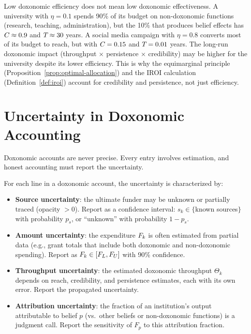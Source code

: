 \begin{remark}
\label{rem:efficiency-effectiveness}
Low doxonomic efficiency does not mean low doxonomic effectiveness.
A university with $\eta = 0.1$ spends 90\% of its budget on non-doxonomic functions (research, teaching, administration), but the 10\% that produces belief effects has $C_{} \approx 0.9$ and $T_{} \approx 30$ years.
A social media campaign with $\eta = 0.8$ converts most of its budget to reach, but with $C_{} = 0.15$ and $T_{} = 0.01$ years.
The long-run doxonomic impact (throughput $\times$ persistence $\times$ credibility) may be higher for the university despite its lower efficiency.
This is why the equimarginal principle (Proposition~\ref{prop:optimal-allocation}) and the IROI calculation (Definition~\ref{def:iroi}) account for credibility and persistence, not just efficiency.
\end{remark}


\section{Uncertainty in Doxonomic Accounting}
\label{sec:ch14-uncertainty}

Doxonomic accounts are never precise.
Every entry involves estimation, and honest accounting must report the uncertainty.

\begin{definition}
\label{def:account-uncertainty}
For each line in a doxonomic account, the uncertainty is characterized by:
\begin{itemize}[nosep]
  \item \textbf{Source uncertainty}: the ultimate funder may be unknown or partially traced (opacity $> 0$).
  Report as a confidence interval: $s_k \in \{$known sources$\}$ with probability $p_s$, or ``unknown'' with probability $1-p_s$.
  \item \textbf{Amount uncertainty}: the expenditure $F_{k}$ is often estimated from partial data (e.g., grant totals that include both doxonomic and non-doxonomic spending).
  Report as $F_{k} \in [F_L, F_U]$ with 90\% confidence.
  \item \textbf{Throughput uncertainty}: the estimated doxonomic throughput $\Theta_k$ depends on reach, credibility, and persistence estimates, each with its own error.
  Report the propagated uncertainty.
  \item \textbf{Attribution uncertainty}: the fraction of an institution's output attributable to belief $p$ (vs.\ other beliefs or non-doxonomic functions) is a judgment call.
  Report the sensitivity of $F_p$ to this attribution fraction.
\end{itemize}
\end{definition}

